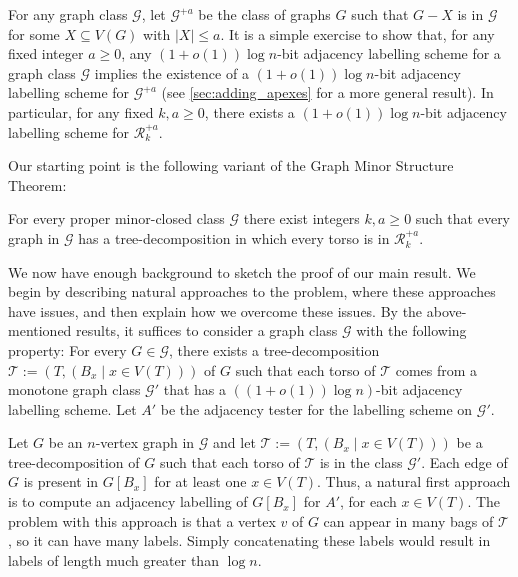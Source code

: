\documentclass[twoside,leqno]{article}
\renewcommand{\ge}{\geqslant}
\renewcommand{\geq}{\geqslant}
\renewcommand{\leq}{\leqslant}
\newcommand{\vida}[1]{\noindent{\color{pink} VD: #1}}
\newcommand{\cyril}[1]{\noindent\textcolor{Green}{CG: #1}}
\newcommand{\defin}[1]{\emph{\textcolor{brightmaroon}{#1}}}
\begin{document}
For any graph class $\mathcal{G}$, let \defin{$\mathcal{G}^{+a}$} be the class of graphs $G$ such that $G-X$ is in $\mathcal{G}$ for some $X\subseteq V(G)$ with $|X|\leq a$.  It is a simple exercise to show that, for any fixed integer $a\ge 0$, any $(1+o(1))\log n$-bit adjacency labelling scheme for a graph class $\mathcal{G}$ implies the existence of a $(1+o(1))\log n$-bit adjacency labelling scheme for $\mathcal{G}^{+a}$ (see \cref{sec:adding_apexes} for a more general result).  In particular, for any fixed $k,a\ge 0$, there exists a $(1+o(1))\log n$-bit adjacency labelling scheme for $\mathcal{R}_k^{+a}$. 

Our starting point is the following variant of the Graph Minor Structure Theorem:

\begin{thm}
  \label{gmpst}
  For every proper minor-closed class $\mathcal{G}$ there exist integers $k,a\geq 0$ such that every graph in $\mathcal{G}$ has a tree-decomposition in which every torso is in $\mathcal{R}_k^{+a}$.
\end{thm}

We now have enough background to sketch the proof of our main result.  We begin by describing natural approaches to the problem, where these approaches have issues, and then explain how we overcome these issues. By the above-mentioned results, it suffices to consider a graph class $\mathcal{G}$ with the following property:
For every $G\in\mathcal{G}$, there exists a tree-decomposition $\mathcal{T}:=(T,(B_x\mid x\in V(T)))$ of $G$ such that each torso of $\mathcal{T}$ comes from a monotone graph class $\mathcal{G}'$ that has a $((1+o(1))\log n)$-bit adjacency labelling scheme.  Let $A'$ be the adjacency tester for the labelling scheme on $\mathcal{G}'$. 

Let $G$ be an $n$-vertex graph in $\mathcal{G}$ and let $\mathcal{T}:=(T,(B_x\mid x\in V(T)))$ be a tree-decomposition of $G$ such that each torso of $\mathcal{T}$ is in the class $\mathcal{G}'$.  Each edge of $G$ is present in $G[B_x]$ for at least one $x\in V(T)$. Thus, a natural first approach is to compute an adjacency labelling of $G[B_x]$ for $A'$, for each $x\in V(T)$.  The problem with this approach is that a vertex $v$ of $G$ can appear in many bags of $\mathcal{T}$, so it can have many labels. Simply concatenating these labels would result in labels of length much greater than $\log n$.
\end{document}
